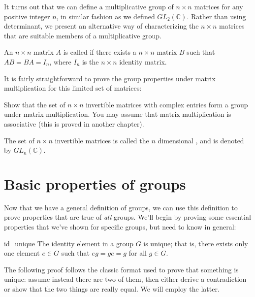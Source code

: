 It turns out that we can define a multiplicative group of $n \times n$ matrices for any positive integer $n$, in similar fashion as we defined $GL_2(\mathbb{C})$.  Rather than using determinant, we present an alternative way of characterizing the $n \times n$ matrices that are suitable members of a multiplicative group.

\begin{defn} 
An $n \times n$ matrix $A$ is called  if there exists a $n \times n$ matrix $B$ such that $AB = BA = I_n$, where $I_n$ is the $n \times n$ identity matrix.
\end{defn}

It is fairly straightforward to prove the group properties under matrix multiplication for this limited set of matrices:

\begin{exercise}{} 
Show that the set of  $n \times n$  invertible matrices with complex entries form a group under matrix multiplication.  You may assume that
matrix multiplication is associative (this is proved  in another chapter). 
\end{exercise}

\begin{defn} 
The set of $n \times n$ invertible matrices is called the $n$ dimensional , and is denoted by $GL_n(\mathbb{C})$.
\end{defn}


\section{Basic properties of groups}\label{Basic properties of groups}
 
Now that we have a general definition of groups, we can use this definition to prove properties that are true of \emph{all} groups. We'll begin by proving some essential properties that we've shown for specific groups, but need to know in general:

\begin{prop}{id_unique}
The identity element in a group $G$ is unique; that is, there exists
only one element $e \in G$ such that $eg = ge = g$ for all $g \in G$. 
\end{prop}
 
\begin{rem}
The following proof follows the classic format used to prove that something is unique: assume instead there are two of them, then either derive a contradiction or show that the two things are really equal.  We will employ the latter.
\end{rem}
 
